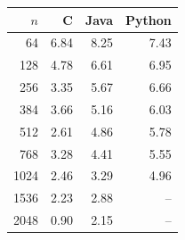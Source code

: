 \begin{tabular}{rrrr}
\toprule
$n$ & C & Java & Python \\
\midrule
64 & 6.84 & 8.25 & 7.43 \\
128 & 4.78 & 6.61 & 6.95 \\
256 & 3.35 & 5.67 & 6.66 \\
384 & 3.66 & 5.16 & 6.03 \\
512 & 2.61 & 4.86 & 5.78 \\
768 & 3.28 & 4.41 & 5.55 \\
1024 & 2.46 & 3.29 & 4.96 \\
1536 & 2.23 & 2.88 & -- \\
2048 & 0.90 & 2.15 & -- \\
\bottomrule
\end{tabular}
